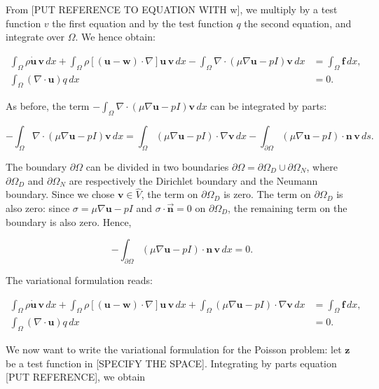 \documentclass[11pt,a4paper,titlepage]{report}
\begin{document}
From [PUT REFERENCE TO EQUATION WITH w], we multiply by a test function $v$ the first equation and by the test function $q$ the second equation, and integrate over $\Omega$. We hence obtain:

\begin{align*}
\int_{\Omega} \rho \dot{\mathbf{u}} \, \mathbf{v} \, dx
+ \int_{\Omega} \rho [(\mathbf{u - w}) \cdot \nabla] \mathbf{u} \, \mathbf{v} \, dx
- \int_{\Omega} \nabla \cdot (\mu \nabla \mathbf{u} -  pI)\mathbf{v} \, dx
&=  \int_{\Omega} \mathbf{f} \, dx, \\
 \int_{\Omega}  (\nabla \cdot \mathbf{u}) q \, dx &= 0.
\end{align*}

As before, the term $- \int_{\Omega} \nabla \cdot (\mu \nabla \mathbf{u} - pI)\mathbf{v} \, dx$ can be integrated by parts:

\[
- \int_{\Omega} \nabla \cdot (\mu \nabla \mathbf{u} - pI)\mathbf{v} \, dx
=  \int_{\Omega} (\mu \nabla \mathbf{u} - pI) \cdot \nabla \mathbf{v} \, dx
- \int_{\partial \Omega} (\mu \nabla \mathbf{u} - pI) \cdot \mathbf{n} \, \mathbf{v} \, ds.
\]

The boundary $\partial \Omega$ can be divided in two boundaries $ \partial \Omega = \partial \Omega_D \cup \partial \Omega_N $, where $\partial \Omega_D$ and $\partial \Omega_N$ are respectively the Dirichlet boundary and the Neumann boundary.
Since we chose $\mathbf{v} \in \hat{V}$, the term on $\partial \Omega_{D}$ is zero. The term on $\partial \Omega_{D}$ is also zero: since $\sigma = \mu \nabla \mathbf{u} - pI$ and $\sigma \cdot \vec{\mathbf{n}} = 0$ on $\partial \Omega_{D}$, the remaining term on the boundary is also zero. Hence,

\[- \int_{\partial \Omega} (\mu \nabla \mathbf{u} - pI) \cdot \mathbf{n} \, \mathbf{v} \, dx = 0.\]

The variational formulation reads:

\begin{align*}
\int_{\Omega} \rho \dot{\mathbf{u}} \, \mathbf{v} \, dx
+ \int_{\Omega} \rho [(\mathbf{u - w}) \cdot \nabla] \mathbf{u} \, \mathbf{v} \, dx
+ \int_{\Omega} (\mu \nabla \mathbf{u} - pI) \cdot \nabla \mathbf{v} \, dx
&=  \int_{\Omega} \mathbf{f} \, dx,  \\
\int_{\Omega} ( \nabla \cdot \mathbf{u} ) q \, dx &= 0.
\end{align*}

We now want to write the variational formulation for the Poisson problem: let $\mathbf{z}$ be a test function in [SPECIFY THE SPACE]. Integrating by parts equation [PUT REFERENCE], we obtain
\end{document}
